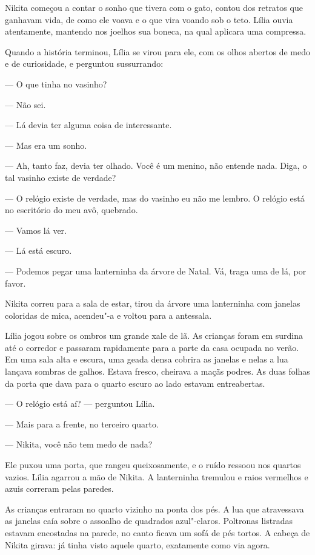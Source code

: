 Nikita começou a contar o sonho que tivera com o gato, contou dos retratos
que ganhavam vida, de como ele voava e o que vira voando sob o teto.
Lília ouvia atentamente, mantendo nos joelhos sua boneca, na qual aplicara uma compressa.

Quando a história terminou, Lília se virou para ele, com os olhos
abertos de medo e de curiosidade, e perguntou sussurrando:

--- O que tinha no vasinho?

--- Não sei.

--- Lá devia ter alguma coisa de interessante.

--- Mas era um sonho.

--- Ah, tanto faz, devia ter olhado. Você é um menino, não entende nada.
Diga, o tal vasinho existe de verdade?

--- O relógio existe de verdade, mas do vasinho eu não me lembro. O
relógio está no escritório do meu avô, quebrado.

--- Vamos lá ver.

--- Lá está escuro.

--- Podemos pegar uma lanterninha da árvore de Natal. Vá, traga uma de
lá, por favor.

Nikita correu para a sala de estar, tirou da árvore uma lanterninha com
janelas coloridas de mica, acendeu"-a e voltou para a antessala.

Lília jogou sobre os ombros um grande xale de lã. As crianças foram em
surdina até o corredor e passaram rapidamente para a parte da casa
ocupada no verão. Em uma sala alta e escura, uma geada densa cobrira as
janelas e nelas a lua lançava sombras de galhos. Estava fresco,
cheirava a maçãs podres. As duas folhas da porta que dava para o quarto
escuro ao lado estavam entreabertas.

--- O relógio está aí? --- perguntou Lília.

--- Mais para a frente, no terceiro quarto.

--- Nikita, você não tem medo de nada?

Ele puxou uma porta, que rangeu queixosamente, e o ruído ressoou nos
quartos vazios. Lília agarrou a mão de Nikita. A lanterninha tremulou e
raios vermelhos e azuis correram pelas paredes.

As crianças entraram no quarto vizinho na ponta dos pés. A lua que
atravessava as janelas caía sobre o assoalho de quadrados azul"-claros.
Poltronas listradas estavam encostadas na parede, no canto ficava um sofá de
pés tortos. A cabeça de Nikita girava: já tinha visto aquele quarto,
exatamente como via agora.

